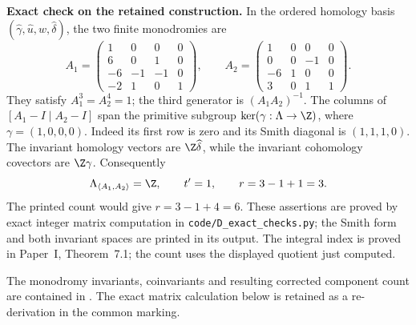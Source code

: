 
\begin{proposition}\label{cdp:st:D.1.3}

\textbf{Exact check on the retained construction.}
In the ordered homology basis
$(\widehat\gamma,\widehat u,\widehat w,\widehat\delta)$,
the two finite monodromies are
\[
A_1=\begin{pmatrix}1&0&0&0\\6&0&1&0\\-6&-1&-1&0\\-2&1&0&1\end{pmatrix},
\qquad
A_2=\begin{pmatrix}1&0&0&0\\0&0&-1&0\\-6&1&0&0\\3&0&1&1\end{pmatrix}.
\]
They satisfy $A_1^3=A_2^4=1$; the third generator is
$(A_1A_2)^{-1}$. The columns of
$[A_1-I\mid A_2-I]$ span the primitive subgroup
$\ker(\gamma:\Lambda\to\Z)$, where $\gamma=(1,0,0,0)$.
Indeed its first row is zero and its Smith diagonal is $(1,1,1,0)$.
The invariant homology vectors are $\Z\widehat\delta$, while the
invariant cohomology covectors are $\Z\gamma$. Consequently
\[
\Lambda_{\langle A_1,A_2\rangle}=\Z,
\qquad t'=1,
\qquad r=3-1+1=3.
\]
The printed count would give $r=3-1+4=6$.
These assertions are proved by exact integer matrix computation in
\texttt{code/D\_exact\_checks.py}; the Smith form and both invariant
spaces are printed in its output. The integral index is proved in Paper~I, Theorem~7.1; the count uses the displayed quotient just computed.
\end{proposition}

The monodromy invariants, coinvariants and resulting corrected component count are contained in \citet[Lemma~2.7, Section~10.5, p.~91, and Appendix~A]{AC2026}. The exact matrix calculation below is retained as a re-derivation in the common marking.



